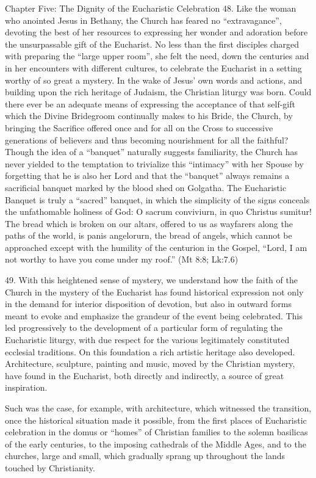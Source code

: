 \documentclass[oneside]{book}
\begin{document}
Chapter Five: The Dignity of the Eucharistic Celebration
48. Like the woman who anointed Jesus in Bethany, the Church has feared no
``extravagance'', devoting the best of her resources to expressing her wonder
and adoration before the unsurpassable gift of the Eucharist. No less than the
first disciples charged with preparing the ``large upper room'', she felt the
need, down the centuries and in her encounters with different cultures, to
celebrate the Eucharist in a setting worthy of so great a mystery. In the wake
of Jesus' own words and actions, and building upon the rich heritage of Judaism,
the Christian liturgy was born. Could there ever be an adequate means of
expressing the acceptance of that self-gift which the Divine Bridegroom
continually makes to his Bride, the Church, by bringing the Sacrifice offered
once and for all on the Cross to successive generations of believers and thus
becoming nourishment for all the faithful?  Though the idea of a ``banquet''
naturally suggests familiarity, the Church has never yielded to the temptation
to trivialize this ``intimacy'' with her Spouse by forgetting that he is also
her Lord and that the ``banquet'' always remains a sacrificial banquet marked by
the blood shed on Golgatha. The Eucharistic Banquet is truly a ``sacred''
banquet, in which the simplicity of the signs conceals the unfathomable holiness
of God:  O sacrum conviviurn, in quo Christus sumitur! The bread which is broken
on our altars, offered to us as wayfarers along the paths of the world, is panis
angelorurn, the bread of angels, which cannot be approached except with the
humility of the centurion in the Gospel, ``Lord, I am not worthy to have you
come under my roof.'' (Mt 8:8; Lk:7.6)

49. With this heightened sense of mystery, we understand how the faith of the
Church in the mystery of the Eucharist has found historical expression not only
in the demand for interior disposition of devotion, but also in outward forms
meant to evoke and emphasize the grandeur of the event being celebrated. This
led progressively to the development of a particular form of regulating the
Eucharistic liturgy, with due respect for the various legitimately constituted
ecclesial traditions. On this foundation a rich artistic heritage also
developed. Architecture, sculpture, painting and music, moved by the Christian
mystery, have found in the Eucharist, both directly and indirectly, a source of
great inspiration.

Such was the case, for example, with architecture, which witnessed the
transition, once the historical situation made it possible, from the first
places of Eucharistic celebration in the domus or ``homes'' of Christian
families to the solemn basilicas of the early centuries, to the imposing
cathedrals of the Middle Ages, and to the churches, large and small, which
gradually sprang up throughout the lands touched by Christianity.
\end{document}
